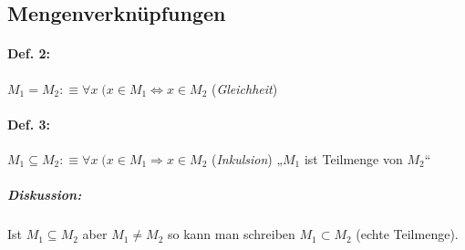\subsection{Mengenverknüpfungen}

\paragraph{Def. 2:} \parskp
$\boxed{M_1 = M_2} : \equiv \boxed{\forall x \; (x\in M_1 \Leftrightarrow x \in M_2}$ (\emph{Gleichheit})
\paragraph{Def. 3:} \parskp
$\boxed{M_1 \subseteq M_2} : \equiv \boxed{\forall x \; (x\in M_1 \Rightarrow x \in M_2}$ (\emph{Inkulsion}) „$M_1$ ist Teilmenge von $M_2$“

\subparagraph{Diskussion:} \parskp
Ist $M_1 \subseteq M_2$ aber $M_1\not = M_2$ so kann man schreiben $M_1\subset M_2$ (echte Teilmenge).

